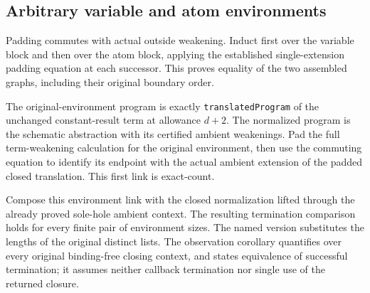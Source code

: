 \subsection{Arbitrary variable and atom environments}
Padding commutes with actual outside weakening. Induct first over the
variable block and then over the atom block, applying the established
single-extension padding equation at each successor. This proves equality
of the two assembled graphs, including their original boundary order.

The original-environment program is exactly \texttt{translatedProgram} of
the unchanged constant-result term at allowance $d+2$. The normalized
program is the schematic abstraction with its certified ambient weakenings.
Pad the full term-weakening calculation for the original environment, then
use the commuting equation to identify its endpoint with the actual ambient
extension of the padded closed translation. This first link is exact-count.

Compose this environment link with the closed normalization lifted through
the already proved sole-hole ambient context. The resulting termination
comparison holds for every finite pair of environment sizes. The named
version substitutes the lengths of the original distinct lists. The
observation corollary quantifies over every original binding-free closing
context, and states equivalence of successful termination; it assumes
neither callback termination nor single use of the returned closure.
